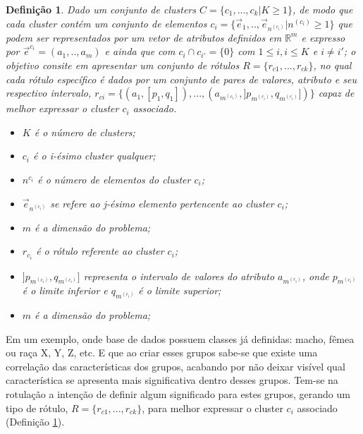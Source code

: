 \newtheorem{defprobLopes}{Definição}
    \begin{defprobLopes}
    Dado um conjunto de clusters ${C=\{c_1,...,c_k | K \geqslant 1\} }$, de modo que cada cluster contém um conjunto de elementos ${c_i=\{\vec{e}_1,..,\vec{e}_{n^{(c_i)}}|n^{(c_i)} \geqslant 1 \}}$ que podem ser representados por um vetor de atributos definidos em ${\mathbb{R}^m }$ e expresso por ${ \vec{e}^{c_i}=(a_1,..,a_m)  }$ e ainda que  com ${ c_i \cap c_{i'}=\{0\} }$ com ${ 1 \leqslant i, i \leqslant K  }$ e ${ i \neq i' }$; o objetivo consite em apresentar um conjunto de rótulos ${ R=\{ r_{c1},...,r_{ck} \} }$, no qual cada rótulo específico é dados por um conjunto de pares de valores, atributo e seu respectivo intervalo, ${ r_{ci}=\{ (a_1,[p_1,q_1]),...,(a_{m^{(c_i)}}, ]p_{m^{(c_i)}},q_{m^{(c_i)}}]) \} }$ capaz de melhor expressar o cluster ${c_i}$ associado.
        \begin{itemize}[noitemsep]
            \item ${K}$ é o número de clusters;
            \item ${c_i}$ é o i-ésimo cluster qualquer;
            \item ${n^{c_i}}$ é o número de elementos do cluster ${c_i}$;
            \item ${\vec{e}_{n^{(c_i)}}}$ se refere ao j-ésimo elemento pertencente ao cluster ${c_i}$;
            \item ${m}$ é a dimensão do problema;
            \item ${r_{c_i}}$ é o rótulo referente ao cluster ${c_i}$;
            \item ${]p_{m^{(c_i)}},q_{m^{(c_i)}}]}$ representa o intervalo de valores do atributo ${a_{m^{(c_i)}} }$, onde ${ p_{m^{(c_i)}} }$  é o limite inferior e ${ q_{m^{(c_i)}} }$ é o limite superior;
            \item ${m}$ é a dimensão do problema;
        \end{itemize}
    \label{teo:lopes:problema}
    \end{defprobLopes}

Em um exemplo, onde base de dados possuem classes já definidas: macho, fêmea ou raça X, Y, Z, etc. E que ao criar esses grupos sabe-se que existe uma correlação das características dos grupos, acabando por não deixar visível qual característica se apresenta mais significativa dentro desses grupos. Tem-se na rotulação a intenção de definir algum significado para estes grupos, gerando um tipo de rótulo, ${ R=\{ r_{c1},...,r_{ck} \} }$, para melhor expressar o cluster ${c_i}$ associado (Definição \ref{teo:lopes:problema}).


